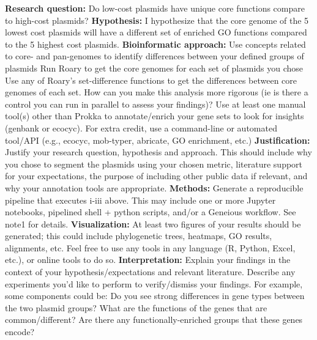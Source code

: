 \documentclass{article}
\begin{document}
\begin{outline}[enumerate]
    \textbf{Research question: }Do low-cost plasmids have unique core functions compare to high-cost plasmids? 
    \textbf{Hypothesis: }I hypothesize that the core genome of the 5 lowest cost plasmids will have a different set of enriched GO functions compared to the 5 highest cost plasmids.
    \2 \textbf{Bioinformatic approach:} Use concepts related to core- and pan-genomes to identify differences between your defined groups of plasmids
        \3 Run Roary to get the core genomes for each set of plasmids you chose
        \3 Use any of Roary’s set-difference functions to get the differences between core genomes of each set. How can you make this analysis more rigorous (ie is there a control you can run in parallel to assess your findings)? 
        \3 Use at least one manual tool(s) other than Prokka to annotate/enrich your gene sets to look for insights (genbank or ecocyc). For extra credit, use a command-line or automated tool/API (e.g., ecocyc, mob-typer, abricate, GO enrichment, etc.)
    \2 \textbf{Justification:} Justify your research question, hypothesis and approach. This should include why you chose to segment the plasmids using your chosen metric, literature support for your expectations, the purpose of including other public data if relevant, and why your annotation tools are appropriate.
    \2 \textbf{Methods:} Generate a reproducible pipeline that executes i-iii above. This may include one or more Jupyter notebooks, pipelined shell + python scripts, and/or a Geneious workflow. See note1 for details.
    \2 \textbf{Visualization:} At least two figures of your results should be generated; this could include phylogenetic trees, heatmaps, GO results, alignments, etc. Feel free to use any tools in any language (R, Python, Excel, etc.), or online tools to do so.
    \2 \textbf{Interpretation:} Explain your findings in the context of your hypothesis/expectations and relevant literature. Describe any experiments you’d like to perform to verify/dismiss your findings. For example, some components could be: Do you see strong differences in gene types between the two plasmid groups?  What are the functions of the genes that are common/different?  Are there any functionally-enriched groups that these genes encode?
\end{outline}
\end{document}
